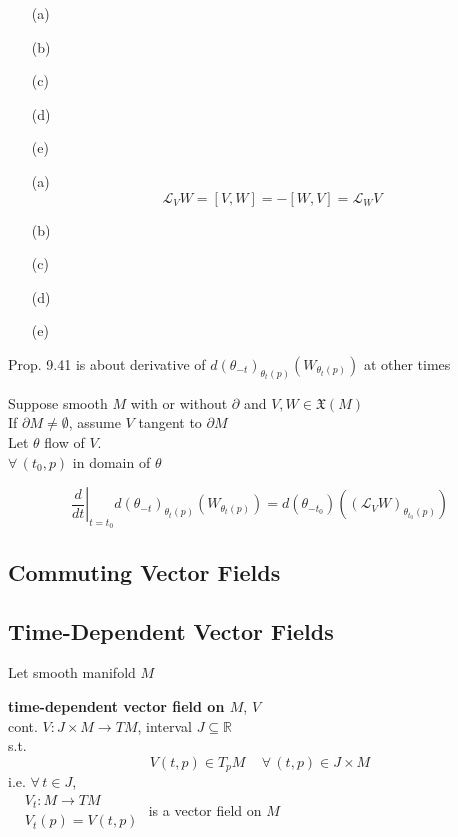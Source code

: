 \begin{corollary}[9.39]
  \begin{enumerate}
    \item[(a)]
    \item[(b)]
    \item[(c)]
    \item[(d)]
    \item[(e)]
\end{enumerate}
\end{corollary}


  \begin{enumerate}
    \item[(a)] \[
\mathcal{L}_VW = [V,W] = -[W,V] = \mathcal{L}_WV
\]
    \item[(b)]
    \item[(c)]
    \item[(d)]
    \item[(e)]
\end{enumerate}


\hrulefill


Prop. 9.41 is about derivative of $d(\theta_{-t})_{\theta_t(p)}(W_{\theta_t(p)})$ at other times

\begin{proposition}[9.41] Suppose smooth $M$ with or without $\partial$ and $V, W \in \mathfrak{X}(M)$ \\
If $\partial M \neq \emptyset$, assume $V$ tangent to $\partial M$ \\
Let $\theta$ flow of $V$.  \\

$\forall \, (t_0,p)$ in domain of $\theta$

\[
\left. \frac{d}{dt} \right|_{t=t_0} d(\theta_{-t})_{\theta_t(p)}(W_{\theta_t(p)})  = d(\theta_{-t_0}) ( (\mathcal{L}_VW)_{\theta_{t_0}(p)} )
\]
\end{proposition}


\subsection*{ Commuting Vector Fields }


\subsection*{ Time-Dependent Vector Fields }

Let smooth manifold $M$ 

\textbf{time-dependent vector field on $M$}, $V$ \\ 
\quad cont. $V: J \times M \to TM$, interval $J \subseteq \mathbb{R}$ \\
\quad \quad s.t. 
\[
V(t,p) \in T_p M \quad \, \forall \, (t,p) \in J \times M
\]
i.e. $\forall \, t \in J$, \\
$\begin{aligned}
  & V_t : M \to TM \\
  & V_t(p) = V(t,p) \end{aligned}$ is a vector field on $M$

